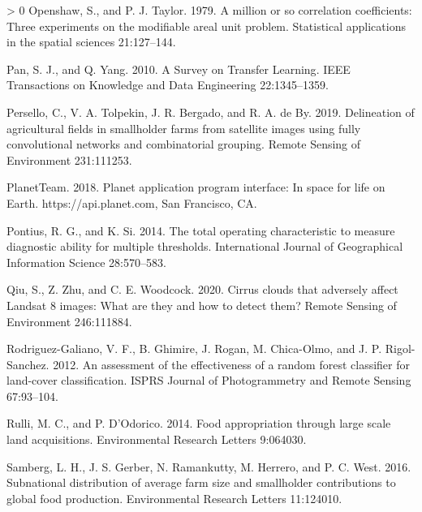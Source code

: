 \documentclass[11pt,a4paper]{article}
\newlength{\cslhangindent}
\newenvironment{CSLReferences}[3] %
 {%
  \setlength{\parindent}{0pt}
  \ifodd #1 \everypar{\setlength{\hangindent}{\cslhangindent}}\ignorespaces\fi
  \ifnum #2 > 0
  \setlength{\parskip}{#2\baselineskip}
  \fi
 }%
 {}
\begin{document}
\begin{CSLReferences}{1}{0}
\leavevmode\hypertarget{ref-Openshawmillioncorrelationcoefficients1979}{}%
Openshaw, S., and P. J. Taylor. 1979. A million or so correlation
coefficients: Three experiments on the modifiable areal unit problem.
Statistical applications in the spatial sciences 21:127--144.

\leavevmode\hypertarget{ref-panSurveyTransferLearning2010}{}%
Pan, S. J., and Q. Yang. 2010. A {Survey} on {Transfer Learning}. IEEE
Transactions on Knowledge and Data Engineering 22:1345--1359.

\leavevmode\hypertarget{ref-perselloDelineationAgriculturalFields2019}{}%
Persello, C., V. A. Tolpekin, J. R. Bergado, and R. A. de By. 2019.
Delineation of agricultural fields in smallholder farms from satellite
images using fully convolutional networks and combinatorial grouping.
Remote Sensing of Environment 231:111253.

\leavevmode\hypertarget{ref-planetteamPlanetApplicationProgram2018}{}%
PlanetTeam. 2018. Planet application program interface: In space for
life on {Earth}. {https://api.planet.com}, {San Francisco, CA}.

\leavevmode\hypertarget{ref-Pontiustotaloperatingcharacteristic2014}{}%
Pontius, R. G., and K. Si. 2014. The total operating characteristic to
measure diagnostic ability for multiple thresholds. International
Journal of Geographical Information Science 28:570--583.

\leavevmode\hypertarget{ref-qiuCirrusCloudsThat2020}{}%
Qiu, S., Z. Zhu, and C. E. Woodcock. 2020. Cirrus clouds that adversely
affect {Landsat} 8 images: {What} are they and how to detect them?
Remote Sensing of Environment 246:111884.

\leavevmode\hypertarget{ref-rodriguez-galianoAssessmentEffectivenessRandom2012}{}%
Rodriguez-Galiano, V. F., B. Ghimire, J. Rogan, M. Chica-Olmo, and J. P.
Rigol-Sanchez. 2012. An assessment of the effectiveness of a random
forest classifier for land-cover classification. ISPRS Journal of
Photogrammetry and Remote Sensing 67:93--104.

\leavevmode\hypertarget{ref-RulliFoodappropriationlarge2014}{}%
Rulli, M. C., and P. D'Odorico. 2014. Food appropriation through large
scale land acquisitions. Environmental Research Letters 9:064030.

\leavevmode\hypertarget{ref-SambergSubnationaldistributionaverage2016}{}%
Samberg, L. H., J. S. Gerber, N. Ramankutty, M. Herrero, and P. C. West.
2016. Subnational distribution of average farm size and smallholder
contributions to global food production. Environmental Research Letters
11:124010.


\end{CSLReferences}
\end{document}
